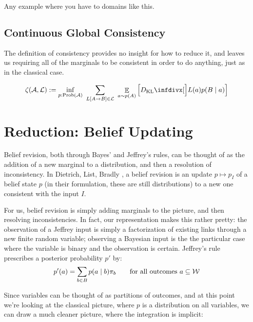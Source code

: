 \documentclass{article}
\begin{document}
	Any example where you have to domains like this.
	\todo{}
	
	\subsection{Continuous Global Consistency}
	The definition of consistency provides no insight for how to reduce it, and leaves us requiring all of the marginals to be consistent in order to do anything, just as in the classical case. 
	
	\begin{equation}
	\zeta(\mathcal A, \mathcal L) := \inf_{p : \mathrm{Prob}(\cal A)}~\sum_{L[A \to B]\in \cal L}~\mathop{\mathbb E}_{a \sim p(A)} \left[\kldiv[\Big]{L(a) }{ p(B \mid a) } \right]
	\end{equation}
	
	\section{Reduction: Belief Updating}
	Belief revision, both through Bayes' and Jeffrey's rules, can be thought of as the addition of a new marginal to a distribution, and then a resolution of inconsistency. In Dietrich, List, Bradly \cite{dietrich2016belief}, a belief revision is an update $p \mapsto p_I$ of a belief state $p$ (in their formulation, these are still distributions) to a new one consistent with the input $I$. 
	
	For us, belief revision is simply adding marginals to the picture, and then resolving inconsistencies. In fact, our representation makes this rather pretty: the observation of a Jeffrey input is simply a factorization of existing links through a new finite random variable; observing a Bayesian input is the the particular case where the variable is binary and the observation is certain.
	Jeffrey's rule prescribes a posterior probability $p'$ by:
	\[ p'(a) = \sum_{b \in B} p(a \mid b) \pi_b \qquad \text{for all outcomes $a \subseteq \cal W$} \]
	
	Since variables can be thought of as partitions of outcomes, and at this point we're looking at the classical picture, where $p$ is a distribution on all variables, we can draw a much cleaner picture, where the integration is implicit:
	
	
	\begin{center}
	\end{center}
\end{document}
